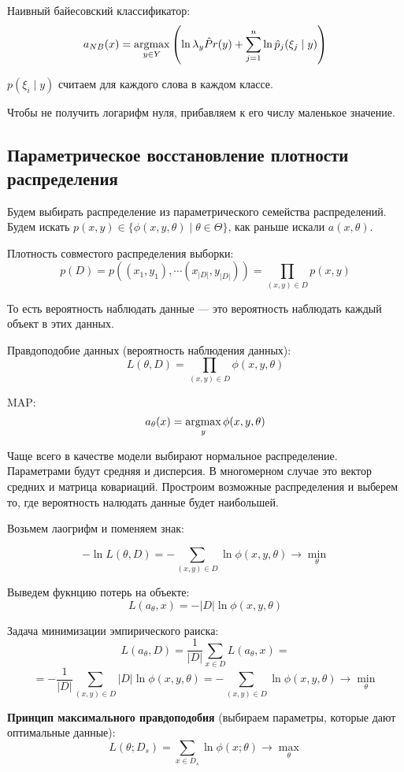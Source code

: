 Наивный байесовский классификатор:
\[
    a_{NB}(x) = \operatorname*{argmax}_{y\in Y} \left( \ln \lambda_y \hat Pr(y) + \sum^n_{j=1}
    \ln \hat p_j (\xi_j \mid y) \right)
\]

$p(\xi_i \mid y)$ считаем для каждого слова в каждом классе.

Чтобы не получить логарифм нуля, прибавляем к его числу маленькое значение.

\subsection{Параметрическое восстановление плотности распределения}

Будем выбирать распределение из параметрического семейства распределений. Будем
искать $p(x, y) \in \{\phi(x, y, \theta) \mid \theta \in \Theta \}$, как раньше
искали $a(x, \theta)$.

Плотность совместого распределения выборки:
\[
    p(D) = p \left( (x_1, y_1), \cdots (x_{|D|}, y_{|D|}) \right) = \prod_{(x,
    y) \in D} p(x, y)
\]

То есть вероятность наблюдать данные --- это вероятность наблюдать каждый
объект в этих данных.

Правдоподобие данных (вероятность наблюдения данных):
\[
    L(\theta, D) = \prod_{(x, y) \in D} \phi(x, y, \theta)
\]

MAP:
\[
    a_{\theta}(x) = \operatorname*{argmax}_y \phi(x, y, \theta)
\]

Чаще всего в качестве модели выбирают нормальное распределение. Параметрами
будут средняя и дисперсия. В многомерном случае это вектор средних и матрица
ковариаций. Простроим возможные распределения и выберем то, где вероятность
налюдать данные будет наибольшей.


Возьмем лаогрифм и поменяем знак:

\[
    - \ln L(\theta, D) = - \sum_{(x, y) \in D} \ln \phi(x, y, \theta) \to
    \min_\theta
\]

Выведем фукнцию потерь на объекте:
\[
    L(a_\theta, x) = - |D| \ln \phi(x, y, \theta)
\]

Задача минимизации эмпирического раиска:
\[
    L(a_\theta, D) = \frac{1}{|D|} \sum_{x\in D} L(a_{\theta}, x) =
\]
\[
    = - \frac{1}{|D|} \sum_{(x, y) \in D} |D| \ln \phi(x, y, \theta) = -
    \sum_{(x, y) \in D} \ln \phi(x, y, \theta) \to \min_\theta
\]

\textbf{Принцип максимального правдоподобия} (выбираем параметры, которые дают
оптимальные данные):
\[
    L(\theta; D_s) = \sum_{x \in D_s} \ln \phi(x; \theta) \to \max_{\theta}
\]

